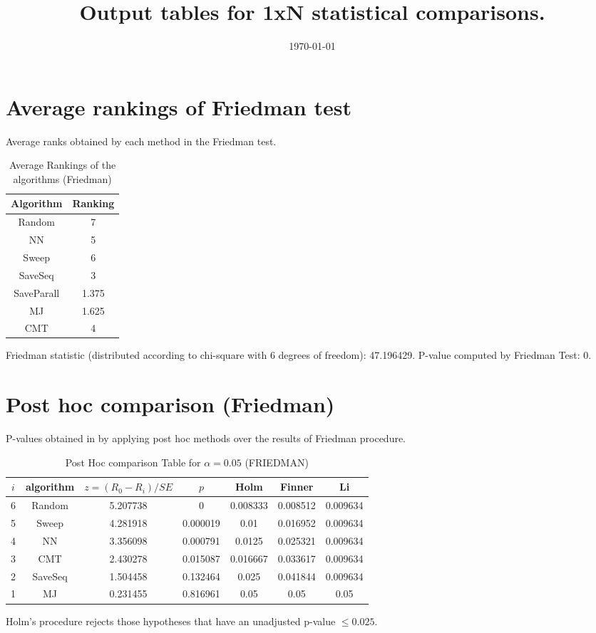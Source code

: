 \documentclass[a4paper,10pt]{article}
\title{Output tables for 1xN statistical comparisons.}
\author{}
\date{\today}
\begin{document}
\begin{landscape}
\pagestyle{empty}
\maketitle
\thispagestyle{empty}

\section{Average rankings of Friedman test}


Average ranks obtained by each method in the Friedman test.

\begin{table}[!htp]
\centering
\begin{tabular}{|c|c|}\hline
Algorithm&Ranking\\\hline
Random&7\\NN&5\\Sweep&6\\SaveSeq&3\\SaveParall&1.375\\MJ&1.625\\CMT&4\\\hline\end{tabular}
\caption{Average Rankings of the algorithms (Friedman)}
\end{table}

Friedman statistic (distributed according to chi-square with 6 degrees of freedom): 47.196429. \newline P-value computed by Friedman Test: 0.\newline


\newpage

\section{Post hoc comparison (Friedman)}


P-values obtained in by applying post hoc methods over the results of Friedman procedure.

\begin{table}[!htp]
\centering\footnotesize
\begin{tabular}{ccccccc}
$i$&algorithm&$z=(R_0 - R_i)/SE$&$p$&Holm &Finner&Li\\
\hline6&Random&5.207738&0&0.008333&0.008512&0.009634\\5&Sweep&4.281918&0.000019&0.01&0.016952&0.009634\\4&NN&3.356098&0.000791&0.0125&0.025321&0.009634\\3&CMT&2.430278&0.015087&0.016667&0.033617&0.009634\\2&SaveSeq&1.504458&0.132464&0.025&0.041844&0.009634\\1&MJ&0.231455&0.816961&0.05&0.05&0.05\\\hline
\end{tabular}
\caption{Post Hoc comparison Table for $\alpha=0.05$ (FRIEDMAN)}
\end{table}Holm's procedure rejects those hypotheses that have an unadjusted p-value $\le0.025$.


\end{landscape}
\end{document}
